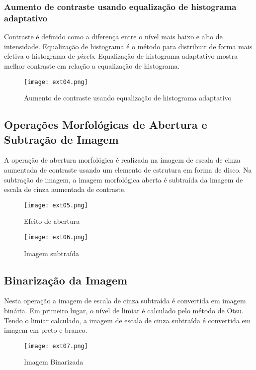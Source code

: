 \subsubsection{Aumento de contraste usando equalização de histograma adaptativo}

Contraste é definido como a diferença entre o nível mais baixo e alto de
intensidade. Equalização de histograma é o método para distribuir de forma mais
efetiva o histograma de \emph{pixels}. Equalização de histograma adaptativo
mostra melhor contraste em relação a equalização de histograma.

\begin{figure}[H]
	\centering
	\texttt{[image: ext04.png]}
	\caption{Aumento de contraste usando equalização de histograma adaptativo}
	\label{fig:ext_contrast_adaptive_histogram}
\end{figure}

\subsection{Operações Morfológicas de Abertura e Subtração de Imagem}

A operação de abertura morfológica é realizada na imagem de escala de cinza
aumentada de contraste usando um elemento de estrutura em forma de disco. Na
subtração de imagem, a imagem morfológica aberta é subtraída da imagem de escala
de cinza aumentada de contraste.

\begin{figure}[H]
	\centering
	\texttt{[image: ext05.png]}
	\caption{Efeito de abertura}
	\label{fig:ext_opening_effect}
\end{figure}

\begin{figure}[H]
	\centering
	\texttt{[image: ext06.png]}
	\caption{Imagem subtraída}
	\label{fig:ext_image_substraction}
\end{figure}

\subsection{Binarização da Imagem}

Nesta operação a imagem de escala de cinza subtraída é convertida em imagem
binária. Em primeiro lugar, o nível de limiar é calculado pelo método de Otsu.
Tendo o limiar calculado, a imagem de escala de cinza subtraída é convertida em
imagem em preto e branco.

\begin{figure}[H]
	\centering
	\texttt{[image: ext07.png]}
	\caption{Imagem Binarizada}
	\label{fig:ext_binarized_image}
\end{figure}

